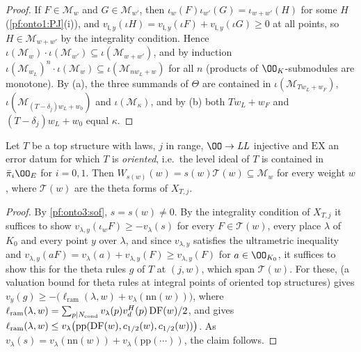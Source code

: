 \begin{proof}
If $F\in\mathcal M_w$ and $G\in\mathcal M_{w'}$, then $\iota_w(F)\iota_{w'}(G)=\iota_{w+w'}(H)$ for some $H$
(\cref{pf:onto1:PJ}(i)), and $v_{\mathfrak l,y}(\iota H)=v_{\mathfrak l,y}(\iota F)+v_{\mathfrak l,y}(\iota G)\ge0$ at all points, so
$H\in\mathcal M_{w+w'}$ by the integrality condition. Hence $\iota(\mathcal M_w)\cdot\iota(\mathcal M_{w'})\subseteq\iota(
\mathcal M_{w+w'})$, and by induction $\iota(\mathcal M_{w_L})^n\cdot\iota(\mathcal M_w)\subseteq\iota(\mathcal M_{nw_L+w})$ for
all $n$ (products of $\OO_K$-submodules are monotone). By (a), the three summands of $\Theta$ are contained in
$\iota(\mathcal M_{Tw_L+w_F})$, $\iota(\mathcal M_{(T-\delta_j)w_L+w_0})$ and $\iota(\mathcal M_\kappa)$, and by (b) both
$Tw_L+w_F$ and $(T-\delta_j)w_L+w_0$ equal $\kappa$.
\end{proof}

\begin{lemma}\label{pf:onto3:thint}
Let $T$ be a top structure with laws, $j$ in range, $\OO\to\mathit{LL}$ injective and $\mathrm{EX}$ an error datum for which
$T$ is \emph{oriented}, i.e.\ the level ideal of $T$ is contained in $\bar\pi_i\OO_E$ for $i=0,1$. Then
$W_{s(w)}(w)=s(w)\mathcal T(w)\subseteq\mathcal M_w$ for every weight $w$, where $\mathcal T(w)$ are the theta forms of
$X_{T,j}$.
\end{lemma}

\begin{proof}
By \cref{pf:onto3:sof}, $s=s(w)\ne0$. By the integrality condition of $X_{T,j}$ it suffices to show
$v_{\lambda,y}(\iota_w F)\ge-v_\lambda(s)$ for every $F\in\mathcal T(w)$, every place $\lambda$ of $K_0$ and every point $y$
over $\lambda$, and since $v_{\lambda,y}$ satisfies the ultrametric inequality and $v_{\lambda,y}(aF)=v_\lambda(a)+v_{\lambda,y}
(F)\ge v_{\lambda,y}(F)$ for $a\in\OO_{K_0}$, it suffices to show this for the theta rules $g$ of $T$ at $(j,w)$, which span
$\mathcal T(w)$. For these,  (a valuation bound for theta
rules at integral points of oriented top structures) gives $v_y(g)\ge-\bigl(\ell_{\mathrm{ram}}(\lambda,w)+v_\lambda(
\mathrm{nn}(w))\bigr)$, where $\ell_{\mathrm{ram}}(\lambda,w)=\sum_{p\mid N_{\mathrm{cond}}}v_\lambda(p)v^H_d(p)
\operatorname{DF}(w)/2$, and  gives $\ell_{\mathrm{ram}}
(\lambda,w)\le v_\lambda\bigl(\mathrm{pp}(\operatorname{DF}(w),c_{1/2}(w),c_{1/2}(w))\bigr)$. As $v_\lambda(s)=v_\lambda(\mathrm{nn}
(w))+v_\lambda(\mathrm{pp}(\cdots))$, the claim follows.
\end{proof}

